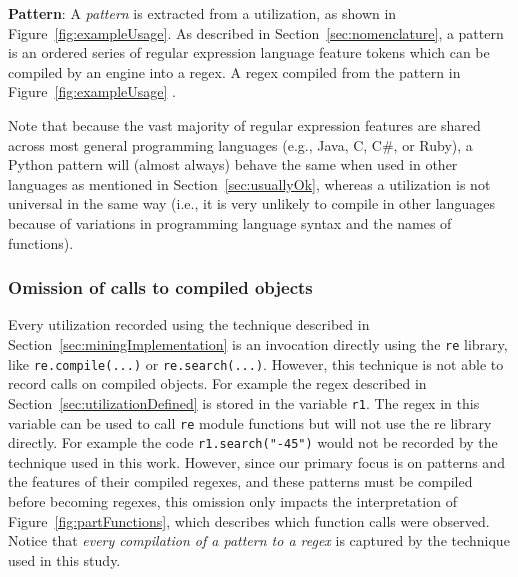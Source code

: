 \noindent \textbf{Pattern}: A \emph{pattern} is extracted from a utilization, as shown in Figure~\ref{fig:exampleUsage}. As described in Section~\ref{sec:nomenclature}, a pattern is an ordered series of regular expression language feature tokens which can be compiled by an engine into a regex.  A regex compiled from the pattern in Figure~\ref{fig:exampleUsage} .

Note that because the vast majority of regular expression features are shared across most general programming languages (e.g., Java, C, C\#, or Ruby), a Python pattern will (almost always) behave the same when used in other languages as mentioned in Section~\ref{sec:usuallyOk}, whereas a utilization is not universal in the same way (i.e., it is very unlikely to compile in other languages because of variations in programming language syntax and the names of functions).

\subsubsection{Omission of calls to compiled objects}
Every utilization recorded using the technique described in Section~\ref{sec:miningImplementation} is an invocation directly using the {\tt re} library, like {\tt re.compile(...)} or {\tt re.search(...)}.  However, this technique is not able to record calls on compiled objects.  For example the regex described in Section~\ref{sec:utilizationDefined} is stored in the variable {\tt r1}.  The regex in this variable can be used to call {\tt re} module functions but will not use the re library directly.  For example the code {\tt r1.search("-45")} would not be recorded by the technique used in this work.  However, since our primary focus is on patterns and the features of their compiled regexes, and these patterns must be compiled before becoming regexes, this omission only impacts the interpretation of Figure~\ref{fig:partFunctions}, which describes which function calls were observed.  Notice that \emph{every compilation of a pattern to a regex} is captured by the technique used in this study.
